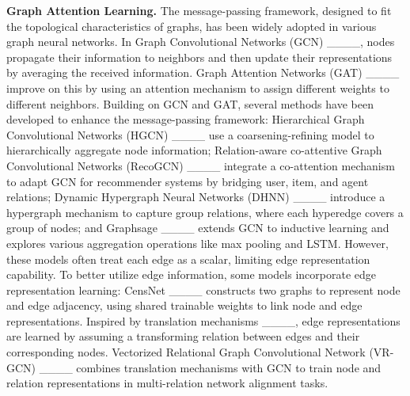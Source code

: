 


\par\smallskip\noindent
\textbf{Graph Attention Learning.} 
The message-passing framework, designed to fit the topological characteristics of graphs, has been widely adopted in various graph neural networks. 
In Graph Convolutional Networks (GCN) ____, nodes propagate their information to neighbors and then update their representations by averaging the received information. 
Graph Attention Networks (GAT) ____ improve on this by using an attention mechanism to assign different weights to different neighbors. 
Building on GCN and GAT, several methods have been developed to enhance the message-passing framework: Hierarchical Graph Convolutional Networks (HGCN) ____ use a coarsening-refining model to hierarchically aggregate node information; 
Relation-aware co-attentive Graph Convolutional Networks (RecoGCN) ____ integrate a co-attention mechanism to adapt GCN for recommender systems by bridging user, item, and agent relations; 
Dynamic Hypergraph Neural Networks (DHNN) ____ introduce a hypergraph mechanism to capture group relations, where each hyperedge covers a group of nodes; 
and Graphsage ____ extends GCN to inductive learning and explores various aggregation operations like max pooling and LSTM. 
However, these models often treat each edge as a scalar, limiting edge representation capability. 
To better utilize edge information, some models incorporate edge representation learning: 
CensNet ____ constructs two graphs to represent node and edge adjacency, using shared trainable weights to link node and edge representations. 
Inspired by translation mechanisms ____, edge representations are learned by assuming a transforming relation between edges and their corresponding nodes. 
Vectorized Relational Graph Convolutional Network (VR-GCN) ____ combines translation mechanisms with GCN to train node and relation representations in multi-relation network alignment tasks.

